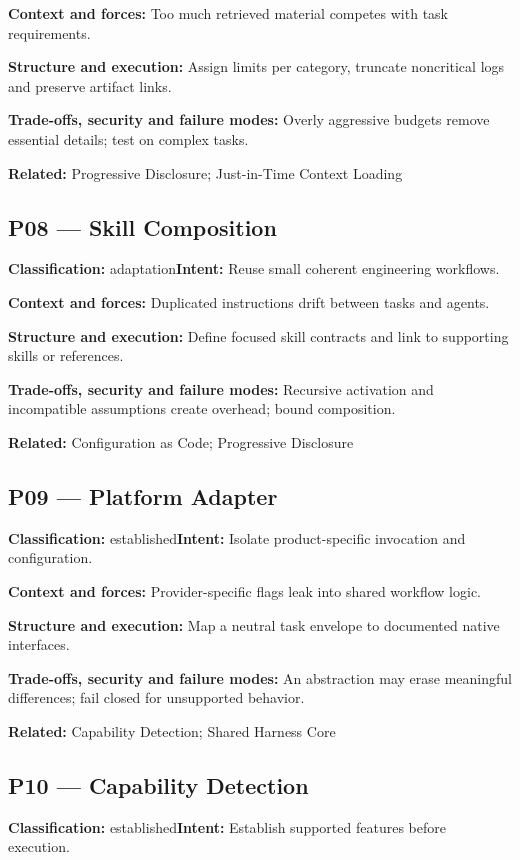 \documentclass[11pt,letterpaper]{article}
\begin{document}
\textbf{Context and forces:} Too much retrieved material competes with task requirements.

\textbf{Structure and execution:} Assign limits per category, truncate noncritical logs and preserve artifact links.

\textbf{Trade-offs, security and failure modes:} Overly aggressive budgets remove essential details; test on complex tasks.

\textbf{Related:} Progressive Disclosure; Just-in-Time Context Loading

\subsection*{P08 --- Skill Composition}
\textbf{Classification:} adaptation\quad\textbf{Intent:} Reuse small coherent engineering workflows.

\textbf{Context and forces:} Duplicated instructions drift between tasks and agents.

\textbf{Structure and execution:} Define focused skill contracts and link to supporting skills or references.

\textbf{Trade-offs, security and failure modes:} Recursive activation and incompatible assumptions create overhead; bound composition.

\textbf{Related:} Configuration as Code; Progressive Disclosure

\subsection*{P09 --- Platform Adapter}
\textbf{Classification:} established\quad\textbf{Intent:} Isolate product-specific invocation and configuration.

\textbf{Context and forces:} Provider-specific flags leak into shared workflow logic.

\textbf{Structure and execution:} Map a neutral task envelope to documented native interfaces.

\textbf{Trade-offs, security and failure modes:} An abstraction may erase meaningful differences; fail closed for unsupported behavior.

\textbf{Related:} Capability Detection; Shared Harness Core

\subsection*{P10 --- Capability Detection}
\textbf{Classification:} established\quad\textbf{Intent:} Establish supported features before execution.
\end{document}
